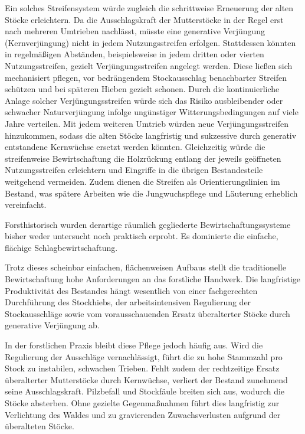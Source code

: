 \documentclass[twocolumn, bibliography=totoc, abstract=true]{scrartcl}
\begin{document}
Ein solches Streifensystem würde zugleich die schrittweise Erneuerung der alten Stöcke erleichtern. Da die Ausschlagskraft der Mutterstöcke in der Regel erst nach mehreren Umtrieben nachlässt, müsste eine generative Verjüngung (Kernverjüngung) nicht in jedem Nutzungsstreifen erfolgen. Stattdessen könnten in regelmäßigen Abständen, beispielsweise in jedem dritten oder vierten Nutzungsstreifen, gezielt Verjüngungsstreifen angelegt werden. Diese ließen sich mechanisiert pflegen, vor bedrängendem Stockausschlag benachbarter Streifen schützen und bei späteren Hieben gezielt schonen. Durch die kontinuierliche Anlage solcher Verjüngungsstreifen würde sich das Risiko ausbleibender oder schwacher Naturverjüngung infolge ungünstiger Witterungsbedingungen auf viele Jahre verteilen. Mit jedem weiteren Umtrieb würden neue Verjüngungsstreifen hinzukommen, sodass die alten Stöcke langfristig und sukzessive durch generativ entstandene Kernwüchse ersetzt werden könnten. Gleichzeitig würde die streifenweise Bewirtschaftung die Holzrückung entlang der jeweils geöffneten Nutzungsstreifen erleichtern und Eingriffe in die übrigen Bestandesteile weitgehend vermeiden. Zudem dienen die Streifen als Orientierungslinien im Bestand, was spätere Arbeiten wie die Jungwuchspflege und Läuterung erheblich vereinfacht.

Forsthistorisch wurden derartige räumlich gegliederte Bewirtschaftungssysteme bisher weder untersucht noch praktisch erprobt. Es dominierte die einfache, flächige Schlagbewirtschaftung.

Trotz dieses scheinbar einfachen, flächenweisen Aufbaus stellt die traditionelle Bewirtschaftung hohe Anforderungen an das forstliche Handwerk. Die langfristige Produktivität des Bestandes hängt wesentlich von einer fachgerechten Durchführung des Stockhiebs, der arbeitsintensiven Regulierung der Stockausschläge sowie vom vorausschauenden Ersatz überalterter Stöcke durch generative Verjüngung ab.

In der forstlichen Praxis bleibt diese Pflege jedoch häufig aus. Wird die Regulierung der Ausschläge vernachlässigt, führt die zu hohe Stammzahl pro Stock zu instabilen, schwachen Trieben. Fehlt zudem der rechtzeitige Ersatz überalterter Mutterstöcke durch Kernwüchse, verliert der Bestand zunehmend seine Ausschlagskraft. Pilzbefall und Stockfäule breiten sich aus, wodurch die Stöcke absterben. Ohne gezielte Gegenmaßnahmen führt dies langfristig zur Verlichtung des Waldes und zu gravierenden Zuwachsverlusten aufgrund der überalteten Stöcke.
\end{document}
